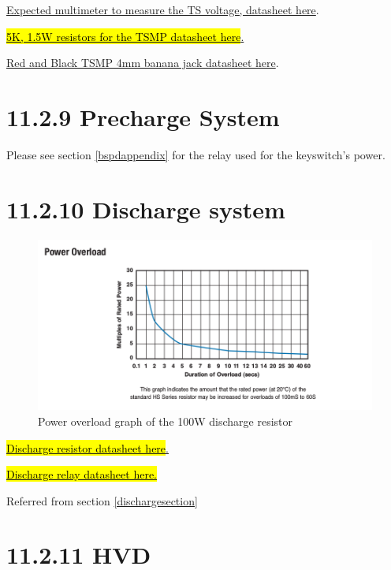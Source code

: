 \documentclass{article}
\DeclareRobustCommand{\hlr}[1]{{\sethlcolor{red}\hl{#1}}}
\begin{document}
\href{https://www.gossenmetrawatt.com/resources/tt/hit27/db_gb.pdf}{Expected multimeter to measure the TS voltage, datasheet here}.

\href{http://www.mouser.com/ds/2/427/cmfind-239942.pdf}{\hlr{5K, 1.5W resistors for the TSMP datasheet here}.}

\href{http://www.mouser.com/ds/2/159/D72930_02_10_06-21562.pdf}{Red and Black TSMP 4mm banana jack datasheet here}.

\section*{11.2.9 Precharge System}
\label{prechargeappendix}

Please see section \ref{bspdappendix} for the relay used for the keyswitch's power.

\section*{11.2.10 Discharge system} \label{dischargeappendix}

\begin{figure}[H]
    \centering
    \includegraphics[width = 0.8 \textwidth]{Dischargeres}
    \caption{Power overload graph of the 100W discharge resistor}
    \label{disres}
\end{figure}

\href{http://www.farnell.com/datasheets/1498243.pdf}{\hlr{Discharge resistor datasheet here}.}

\href{http://cotorelay.com/product/5500-series-high-voltage-reed-relays/}{\hlr{Discharge relay datasheet here.}}

Referred from section \ref{dischargesection}

\section*{11.2.11 HVD } \label{hvdappendix}
\end{document}
